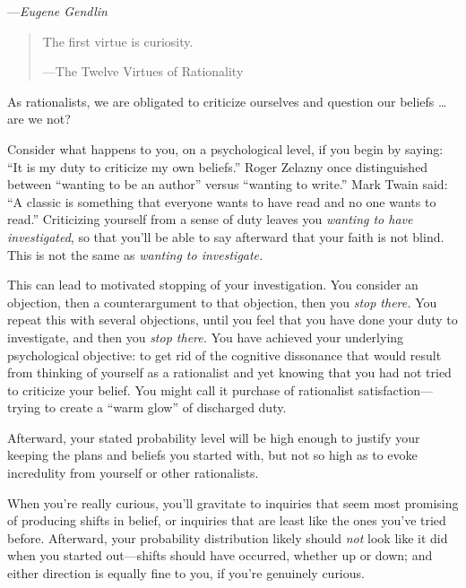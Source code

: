 {\raggedleft
 {}---\textit{Eugene Gendlin}
\par}


\myendsectiontext


\begin{quote}
{
 The first virtue is curiosity.}

{\raggedleft
 {}---The Twelve Virtues of Rationality
\par}
\end{quote}

{
 As rationalists, we are obligated to criticize ourselves and
question our beliefs \ldots are we not?}

{
 Consider what happens to you, on a psychological level, if you
begin by saying: ``It is my duty to criticize my own
beliefs.'' Roger Zelazny once distinguished between
``wanting to be an author'' versus
``wanting to write.'' Mark Twain
said: ``A classic is something that everyone wants to
have read and no one wants to read.'' Criticizing
yourself from a sense of duty leaves you \textit{wanting to have
investigated}, so that you'll be able to say afterward
that your faith is not blind. This is not the same as \textit{wanting
to investigate.}}

{
 This can lead to motivated stopping of your investigation. You
consider an objection, then a counterargument to that objection, then
you \textit{stop there.} You repeat this with several objections, until
you feel that you have done your duty to investigate, and then you
\textit{stop there.} You have achieved your underlying psychological
objective: to get rid of the cognitive dissonance that would result
from thinking of yourself as a rationalist and yet knowing that you had
not tried to criticize your belief. You might call it purchase of
rationalist satisfaction---trying to create a ``warm
glow'' of discharged duty.}

{
 Afterward, your stated probability level will be high enough to
justify your keeping the plans and beliefs you started with, but not so
high as to evoke incredulity from yourself or other rationalists.}

{
 When you're really curious, you'll
gravitate to inquiries that seem most promising of producing shifts in
belief, or inquiries that are least like the ones
you've tried before. Afterward, your probability
distribution likely should \textit{not} look like it did when you
started out---shifts should have occurred, whether up or down; and
either direction is equally fine to you, if you're
genuinely curious.}

